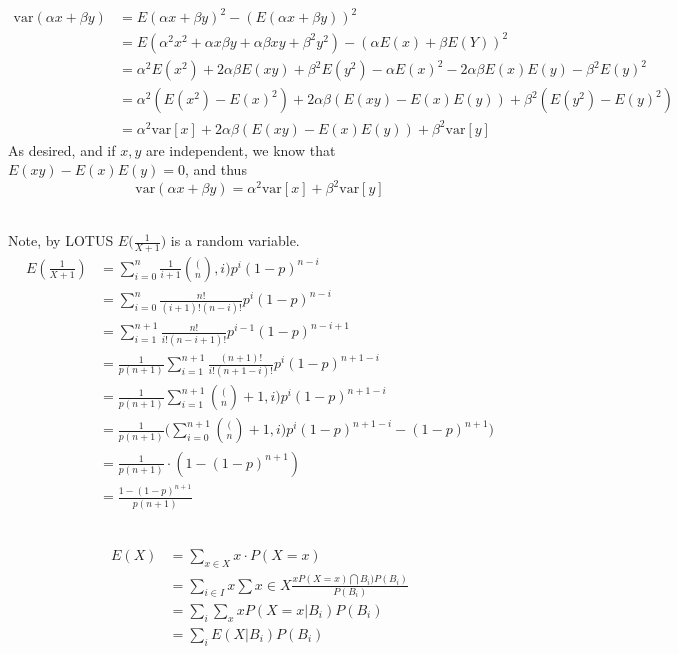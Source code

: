 \documentclass[letterpaper,12pt]{article}
\theoremstyle{definition}
\begin{document}
\\
\begin{align*}
    \text{var}(\alpha x + \beta y) & = E (\alpha x + \beta y)^2 - (E(\alpha x + \beta y) )^2 \\
    & = E(\alpha^2 x^2 + \alpha x \beta y + \alpha \beta xy + \beta^2 y^2) - (\alpha E(x) + \beta E(Y))^2 \\
    & = \alpha^2 E(x^2) + 2\alpha \beta E(xy) + \beta ^2 E(y^2) - \alpha E(x)^2 - 2 \alpha \beta E(x)E(y) - \beta ^2 E(y)^2 \\
    & = \alpha ^2 (E(x^2)-E(x)^2) + 2\alpha \beta (E(xy)-E(x)E(y)) + \beta^2(E(y^2)-E(y)^2) \\
    & = \alpha^2 \text{var}[x] + 2\alpha \beta(E(xy)-E(x)E(y))+\beta^2 \text{var}[y]
\end{align*}
As desired, and if $x,y$ are independent, we know that $E(xy)-E(x)E(y)= 0$, and thus
\[
    \text{var}(\alpha x + \beta y) = \alpha^2 \text{var}[x] +\beta^2 \text{var}[y]
\]


\\
Note, by LOTUS $E\big(\frac{1}{X+1}\big)$ is a random variable.
\begin{align*}
    E(\frac{1}{X+1}) & = \sum_{i=0}^n \frac{1}{i+1} \binom(n,i) p^i (1-p)^{n-i} \\
    & = \sum_{i=0}^n \frac{n!}{(i+1)!(n-i)!}  p^i (1-p)^{n-i} \\
    & = \sum_{i=1}^{n+1} \frac{n!}{i!(n-i+1)!} p^{i-1} (1-p)^{n-i+1}\\
    & = \frac{1}{p(n+1)} \sum_{i=1}^{n+1} \frac{(n+1)!}{i!(n+1-i)!} p^{i} (1-p)^{n+1-i} \\
    & = \frac{1}{p(n+1)} \sum_{i=1}^{n+1} \binom(n+1,i) p^{i} (1-p)^{n+1-i} \\
    & = \frac{1}{p(n+1)} \big(\sum_{i=0}^{n+1} \binom(n+1,i) p^{i} (1-p)^{n+1-i}-(1-p)^{n+1}\big) \\
    & = \frac{1}{p(n+1)}\cdot (1-(1-p)^{n+1}) \\
    & = \frac{1-(1-p)^{n+1}}{p(n+1)} 
\end{align*}

\\
\begin{align*}
    E(X) &= \sum_{x \in X} x \cdot P(X=x) \\
    & = \sum_{i \in I} x \sum{x \in X} \frac{x P(X = x) \bigcap B_i) P(B_i)}{P(B_i)}\\
    & = \sum_i \sum_x x P(X=x|B_i)P(B_i) \\
    & = \sum_i E(X|B_i)P(B_i)
\end{align*}
\end{document}
